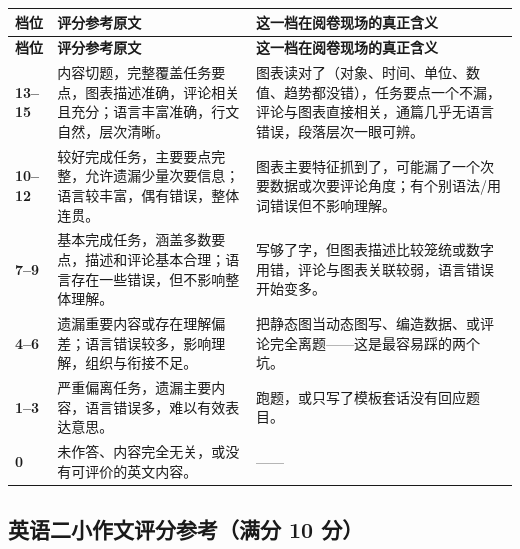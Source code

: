 \documentclass[11pt,a4paper]{ctexart}
\begin{document}
\begin{longtable}{C{1.5cm} L{6.2cm} L{7.4cm}}
\toprule
\textbf{档位} & \textbf{评分参考原文} & \textbf{这一档在阅卷现场的真正含义}\\
\midrule
\endfirsthead
\toprule
\textbf{档位} & \textbf{评分参考原文} & \textbf{这一档在阅卷现场的真正含义}\\
\midrule
\endhead
\textbf{13--15} & 内容切题，完整覆盖任务要点，图表描述准确，评论相关且充分；语言丰富准确，行文自然，层次清晰。 & 图表读对了（对象、时间、单位、数值、趋势都没错），任务要点一个不漏，评论与图表直接相关，通篇几乎无语言错误，段落层次一眼可辨。\\
\midrule
\textbf{10--12} & 较好完成任务，主要要点完整，允许遗漏少量次要信息；语言较丰富，偶有错误，整体连贯。 & 图表主要特征抓到了，可能漏了一个次要数据或次要评论角度；有个别语法/用词错误但不影响理解。\\
\midrule
\textbf{7--9} & 基本完成任务，涵盖多数要点，描述和评论基本合理；语言存在一些错误，但不影响整体理解。 & 写够了字，但图表描述比较笼统或数字用错，评论与图表关联较弱，语言错误开始变多。\\
\midrule
\textbf{4--6} & 遗漏重要内容或存在理解偏差；语言错误较多，影响理解，组织与衔接不足。 & 把静态图当动态图写、编造数据、或评论完全离题——这是最容易踩的两个坑。\\
\midrule
\textbf{1--3} & 严重偏离任务，遗漏主要内容，语言错误多，难以有效表达意思。 & 跑题，或只写了模板套话没有回应题目。\\
\midrule
\textbf{0} & 未作答、内容完全无关，或没有可评价的英文内容。 & ——\\
\bottomrule
\end{longtable}

\subsection{英语二小作文评分参考（满分 10 分）}
\end{document}
